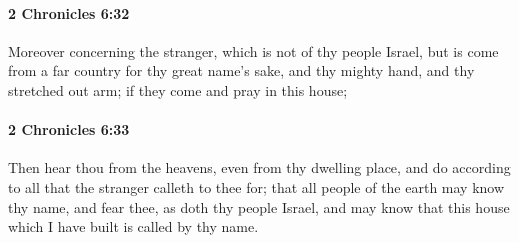 		\paragraph{2 Chronicles 6:32} %
			\label{2CHRONICLES-6-32}

			Moreover concerning the stranger, which is not of thy people Israel, but is come from a far country for thy great name's sake, and thy mighty hand, and thy stretched out arm; if they come and pray in this house;


		\paragraph{2 Chronicles 6:33} %
			\label{2CHRONICLES-6-33}

			Then hear thou from the heavens, even from thy dwelling place, and do according to all that the stranger calleth to thee for; that all people of the earth may know thy name, and fear thee, as doth thy people Israel, and may know that this house which I have built is called by thy name.


